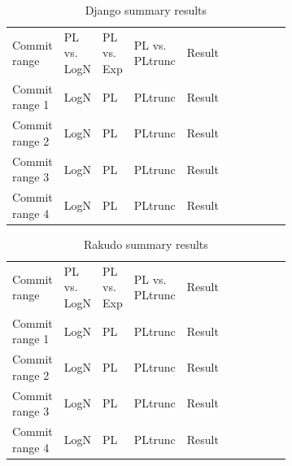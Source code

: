 \documentclass[conference]{IEEEtran}
\begin{document}
\begin{table}[h!tbp]
	\caption{Django summary results}
	\begin{center}
		\begin{tabular}{| p{0.12\linewidth} | p{0.08\linewidth} | p{0.08\linewidth} | p{0.08\linewidth} | p{0.1\linewidth} |p{0.13\linewidth} | p{0.09\linewidth} |}
			\hline
                  Commit range & PL vs. LogN & PL vs. Exp & PL vs. PLtrunc & Result \\
                  Commit range 1 &  LogN & PL  &PLtrunc & Result \\
                  Commit range 2&  LogN & PL  &PLtrunc & Result \\
                  Commit range 3&  LogN & PL  &PLtrunc & Result \\
                  Commit range 4&  LogN & PL  &PLtrunc & Result \\
			\hline

			\hline
		\end{tabular}
	\end{center}
\label{tab:2019testsdjango}
\end{table}


\begin{table}[h!tbp]
	\caption{Rakudo summary results}
	\begin{center}
		\begin{tabular}{| p{0.12\linewidth} | p{0.08\linewidth} | p{0.08\linewidth} | p{0.08\linewidth} | p{0.1\linewidth} |p{0.13\linewidth} | p{0.09\linewidth} |}
			\hline
                  Commit range & PL vs. LogN & PL vs. Exp & PL vs. PLtrunc & Result \\
                  Commit range 1 &   LogN & PL  &PLtrunc & Result \\
                  Commit range 2&  LogN & PL  &PLtrunc & Result \\
                  Commit range 3&  LogN & PL  &PLtrunc & Result \\
                  Commit range 4&  LogN & PL  &PLtrunc & Result \\
			\hline

			\hline
		\end{tabular}
	\end{center}
\label{tab:2019testsrakudo}
\end{table}
\end{document}
